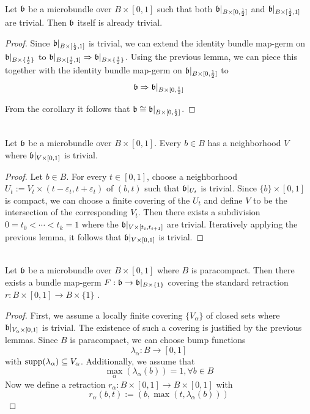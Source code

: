 \begin{file}
\newcommand{\A}[1][] {
    A_\alpha#1
}

\newcommand{\bbleft} {
    \bb\restr{B \times{} [0, \half]}
}
\newcommand{\bbright} {
    \bb\restr{B \times{} [\half, 1]}
}
\newcommand{\bbhalf} {
    \bb\restr{B \times{} \{ \half \}}
}

 \\
Let $\mathfrak{b}$ be a microbundle over $B \times [0, 1]$ such that both $\bbleft$ and $\bbright$ are trivial.
Then $\mathfrak{b}$ itself is already trivial.
\begin{proof}
Since $\bbright$ is trivial, we can extend the identity bundle map-germ on $\bbhalf$ to $\bbright \double \bbhalf$.
Using the previous lemma, we can piece this together with the identity bundle map-germ on $\bbleft$ to
\[ \bb \double \bbleft \]

From the corollary it follows that $\bb \cong \bbleft$.
\end{proof}

\lemma{()} \\
Let $\mathfrak{b}$ be a microbundle over $B \times [0, 1]$.
Every $b \in B$ has a neighborhood $V$ where $\mathfrak{b}\vert_{V \times [0, 1]}$ is trivial.
\begin{proof}
Let $b \in B$.
For every $t \in [0, 1]$, choose a neighborhood $U_t := V_t \times (t - \varepsilon_t, t + \varepsilon_t)$ of $(b, t)$ such that $\mathfrak{b}\vert_{U_t}$ is trivial.
Since $\{b\} \times [0, 1]$ is compact, we can choose a finite covering of the $U_t$ and define $V$ to be the intersection of the corresponding $V_t$.
Then there exists a subdivision $0 = t_0 < \cdots < t_k = 1$ where the $\mathfrak{b}\vert_{V \times [t_{i}, t_{i + 1}]}$ are trivial.
Iteratively applying the previous lemma, it follows that $\mathfrak{b}\vert_{V \times [0, 1]}$ is trivial.
\end{proof}

\lemma{()} \\
Let $\mathfrak{b}$ be a microbundle over $B \times [0, 1]$ where $B$ is paracompact.
Then there exists a bundle map-germ $F: \mathfrak{b} \to \mathfrak{b}\vert_{B \times \{1\}}$
covering the standard retraction $r: B \times [0, 1] \to B \times \{1\}$ .
\begin{proof}
First, we assume a locally finite covering $\{V_\alpha\}$ of closed sets where $\mathfrak{b}\vert_{V_\alpha \times [0, 1]}$ is trivial.
The existence of such a covering is justified by the previous lemmas.
Since $B$ is paracompact, we can choose bump functions 
\[ \lambda_\alpha: B \to [0, 1] \]
with $\text{supp}(\lambda_\alpha) \subseteq{} V_\alpha$.
Additionally, we assume that 
\[ \max_{\alpha}(\lambda_\alpha(b)) = 1, \forall b \in B \]
Now we define a retraction $r_\alpha: B \times [0, 1] \to B \times [0, 1]$ with
\[ r_\alpha(b, t) := (b, \max(t, \lambda_\alpha(b))) \]


\end{proof}
\end{file}
